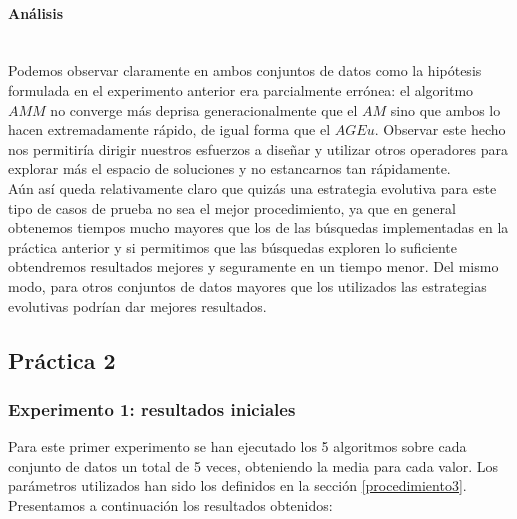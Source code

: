 \documentclass[11pt,a4paper]{article}
\begin{document}
	
	\paragraph{ Análisis } \ \\
	
	Podemos observar claramente en ambos conjuntos de datos como la hipótesis formulada en el experimento anterior era parcialmente errónea: el algoritmo $AMM$ no converge más deprisa generacionalmente que el $AM$ sino que ambos lo hacen extremadamente rápido, de igual forma que el $AGEu$. Observar este hecho nos permitiría dirigir nuestros esfuerzos a diseñar y utilizar otros operadores para explorar más el espacio de soluciones y no estancarnos tan rápidamente. \\
	
	Aún así queda relativamente claro que quizás una estrategia evolutiva para este tipo de casos de prueba no sea el mejor procedimiento, ya que en general obtenemos tiempos mucho mayores que los de las búsquedas implementadas en la práctica anterior y si permitimos que las búsquedas exploren lo suficiente obtendremos resultados mejores y seguramente en un tiempo menor. Del mismo modo, para otros conjuntos de datos mayores que los utilizados las estrategias evolutivas podrían dar mejores resultados.

	\subsection{ Práctica 2 } \label{sec63}
	
	\subsubsection{ Experimento 1: resultados iniciales}

	Para este primer experimento se han ejecutado los 5 algoritmos sobre cada conjunto de datos un total de 5 veces, obteniendo la media para cada valor. Los parámetros utilizados han sido los definidos en la sección \ref{procedimiento3}. Presentamos a continuación los resultados obtenidos:
	
\end{document}
